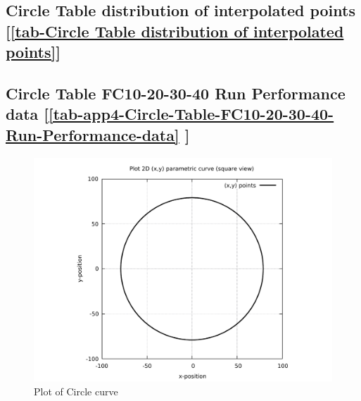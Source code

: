 \subsection    {Circle Table distribution of interpolated points
[\ref      {tab-Circle Table distribution of interpolated points}] }
\label{ssec-tab-Circle Table distribution of interpolated points}

\subsection          {Circle Table FC10-20-30-40 Run Performance data
[\ref       {tab-app4-Circle-Table-FC10-20-30-40-Run-Performance-data} ] }
\label{ssec-tab-app4-Circle-Table-FC10-20-30-40-Run-Performance-data}


\clearpage
\pagebreak

\begin{figure}
	\caption     {Plot of Circle curve}
	\label{01-img-Plot of Circle curve.pdf}
	\includegraphics[width=1.00\textwidth]{Chap4/appendix/app-Circle/plots/01-img-Plot of Circle curve.pdf}
\end{figure}	



